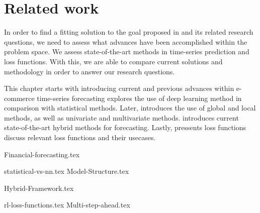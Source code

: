 \chapter{Related work}
\label{section:RelatedWork}

\iffalse
  Our problem can be composed into two main categories.
  time-series forecasting, and e-commerce trend forecasting.
  What is the characteristics of e-commerce trend forecasting?
  The domain consists of multiple time-series, some which correlate.
  The time-series contains multiple periods, for example users shop
  online ofter on sundays than on mondays.
  Some categories are popular in the spring, others in the fall.
  Mabye online shopping spikes around common paydays?
\fi


In order to find a fitting solution to the goal proposed in  and its related research questions,
we need to assess what advances have been accomplished within the problem space.
We assess state-of-the-art methods in time-series prediction and loss functions.
With this, we are able to compare current solutions and methodology in order to answer our research questions.

This chapter starts with  introducing current and previous advances within e-commerce time-series forecasting
 explores the use of deep learning method in comparison with statistical methods.
Later,  introduces the use of global and local methods, as well as univariate and multivariate methods.
 introduces current state-of-the-art hybrid methods for forecasting.
Lastly,  pressents loss functions discuss relevant loss functions and their usecases.



{Financial-forecasting.tex}

{statistical-vs-nn.tex}
{Model-Structure.tex}

{Hybrid-Framework.tex}

{rl-loss-functions.tex}
{Multi-step-ahead.tex}
